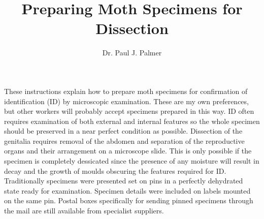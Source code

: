 \documentclass[]{article}
\title{Preparing Moth Specimens for Dissection}
\author{Dr. Paul J. Palmer}
\begin{document}
{}
%


%	

These instructions explain how to prepare moth specimens for confirmation of  identification (ID) by microscopic examination. These are my own preferences, but other workers will probably accept specimens prepared in this way. ID often requires examination of both external and internal features so the whole specimen should be preserved in a near perfect condition as possible. Dissection of the genitalia requires removal of the abdomen and separation of the reproductive organs and their arrangement on a microscope slide. This is only possible if the specimen is completely dessicated since the presence of any moisture will result in decay and the growth of moulds obscuring the features required for ID. Traditionally specimens were presented set on pins in a perfectly dehydrated state ready for examination. Specimen details were included  on labels mounted on the same pin. Postal boxes specifically for  sending pinned specimens through the mail are still available from specialist suppliers.
\end{document}
